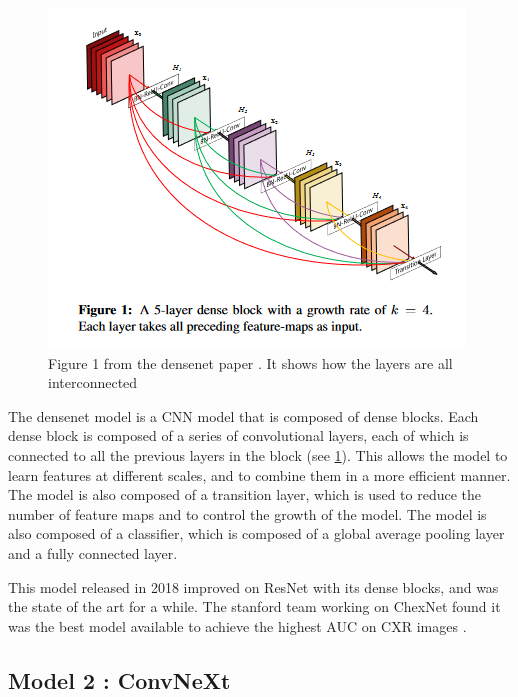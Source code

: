 \documentclass[11pt]{article}
\begin{document}
    \begin{figure}[h]

         \centering
         \includegraphics[width=0.8 \textwidth]{plots/densenet_figure}
         \caption{Figure 1 from the densenet paper \cite{densenet}. It shows how the layers are all interconnected}
         \label{fig:densenet_figure}

    \end{figure}

        The densenet model is a CNN model that is composed of dense blocks. Each dense block is composed of a series of convolutional layers,
        each of which is connected to all the previous layers in the block (see \ref{fig:densenet_figure}). This allows the model to learn features at different scales, and to
        combine them in a more efficient manner. The model is also composed of a transition layer, which is used to reduce the number of feature maps
        and to control the growth of the model. The model is also composed of a classifier, which is composed of a global average pooling layer and a fully connected layer.



        This model released in 2018 improved on ResNet with its dense blocks, and was the state of the art for a while. The stanford team working on ChexNet found it was the best model available to achieve the highest AUC on CXR images \cite{chexnet}.


    \subsection{Model 2 : ConvNeXt \cite{convnext}}
\end{document}
